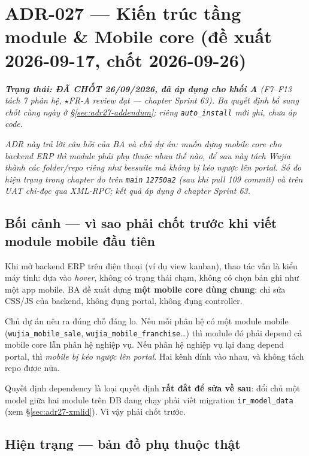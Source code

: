 \chapter{ADR-027 --- Kiến trúc tầng module \& Mobile core (đề xuất 2026-09-17, chốt 2026-09-26)}

\sloppy

\emph{\textbf{Trạng thái: ĐÃ CHỐT 26/09/2026, đã áp dụng cho khối A} (F7--F13 tách 7 phân hệ, $\star$FR-A
review đạt --- chapter Sprint 63). Ba quyết định bổ sung chốt cùng ngày ở \S\ref{sec:adr27-addendum};
riêng \texttt{auto\_install} mới ghi, chưa áp code.}

\emph{ADR này trả lời câu hỏi của BA và chủ dự án: muốn dựng \emph{mobile core} cho backend ERP thì
module phải phụ thuộc nhau thế nào, để sau này tách Wujia thành các folder/repo riêng như
beesuite mà không bị kéo ngược lên portal. Số đo hiện trạng trong chapter đo trên \texttt{main}
\texttt{12750a2} (sau khi pull 109 commit) và trên UAT chỉ-đọc qua XML-RPC; kết quả áp dụng ở chapter Sprint 63.}

\section{Bối cảnh --- vì sao phải chốt trước khi viết module mobile đầu tiên}

Khi mở backend ERP trên điện thoại (ví dụ view kanban), thao tác vẫn là kiểu máy tính: dựa
vào \emph{hover}, không có trạng thái chạm, không có chọn bản ghi như một app mobile. BA đề
xuất dựng \textbf{một mobile core dùng chung}: chỉ sửa CSS/JS của backend, không đụng portal,
không đụng controller.

Chủ dự án nêu ra đúng chỗ đáng lo. Nếu mỗi phân hệ có một module mobile
(\texttt{wujia\_mobile\_sale}, \texttt{wujia\_mobile\_franchise}\ldots) thì module đó phải depend
cả mobile core lẫn phân hệ nghiệp vụ. Nếu phân hệ nghiệp vụ lại đang depend portal, thì
\emph{mobile bị kéo ngược lên portal}. Hai kênh dính vào nhau, và không tách repo được nữa.

Quyết định dependency là loại quyết định \textbf{rất đắt để sửa về sau}: đổi chủ một model giữa
hai module trên DB đang chạy phải viết migration \texttt{ir\_model\_data} (xem \S\ref{sec:adr27-xmlid}).
Vì vậy phải chốt trước.

\section{Hiện trạng --- bản đồ phụ thuộc thật}

